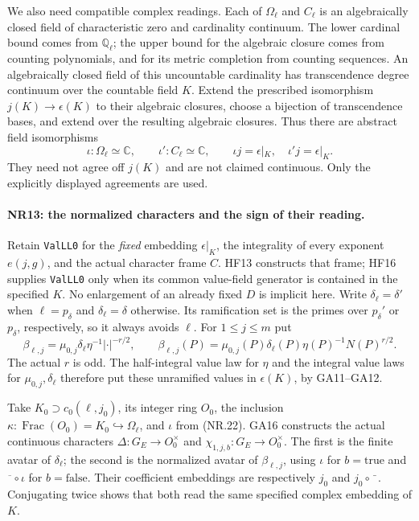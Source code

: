 We also need compatible complex readings. Each of $\Omega_\ell$
and $C_\ell$ is an algebraically closed field of characteristic
zero and cardinality continuum. The lower cardinal bound comes
from $\mathbb Q_\ell$; the upper bound for the algebraic closure
comes from counting polynomials, and for its metric completion
from counting sequences. An algebraically closed field of this
uncountable cardinality has transcendence degree continuum over
the countable field $K$. Extend the prescribed isomorphism
$j(K)\to\epsilon(K)$ to their algebraic closures, choose a
bijection of transcendence bases, and extend over the resulting
algebraic closures. Thus there are abstract field isomorphisms
\[
 \iota:\Omega_\ell\simeq\mathbb C,\qquad
 \iota':C_\ell\simeq\mathbb C,\qquad
           \iota j=\epsilon|_K,\quad\iota'j=\epsilon|_K.
                                                               \tag{NR.22}
\]
They need not agree off $j(K)$ and are not claimed continuous.
Only the explicitly displayed agreements are used.

\paragraph{NR13: the normalized characters and the sign of their reading.}
Retain \texttt{ValLL0} for the \emph{fixed} embedding
$\epsilon|_K$, the integrality of every exponent $e(j,g)$, and
the actual character frame $C$. HF13 constructs that frame;
HF16 supplies \texttt{ValLL0} only when its common value-field
generator is contained in the specified $K$. No enlargement of
an already fixed $D$ is implicit here.
Write $\delta_\ell=\delta'$ when $\ell=p_\delta$ and
$\delta_\ell=\delta$ otherwise. Its ramification set is the
primes over $p_\delta'$ or $p_\delta$, respectively, so it always
avoids $\ell$. For $1\le j\le m$ put
\[
 \beta_{\ell,j}
     =\mu_{0,j}\delta_\ell\eta^{-1}|\cdot|^{-r/2},
 \qquad
 \beta_{\ell,j}(P)
     =\mu_{0,j}(P)\delta_\ell(P)\eta(P)^{-1}N(P)^{r/2}.
                                                               \tag{NR.23}
\]
The actual $r$ is odd. The half-integral value law for $\eta$
and the integral value laws for $\mu_{0,j},\delta_\ell$ therefore
put these unramified values in $\epsilon(K)$, by GA11--GA12.

Take $K_0\supset c_0(\ell,j_0)$, its integer ring $O_0$, the
inclusion $\kappa:\operatorname{Frac}(O_0)=K_0\hookrightarrow
\Omega_\ell$, and $\iota$ from (NR.22). GA16 constructs the
actual continuous characters $\Delta:G_E\to O_0^\times$ and
$\chi_{1,j,b}:G_E\to O_0^\times$. The first is the finite
avatar of $\delta_\ell$; the second is the normalized avatar of
$\beta_{\ell,j}$, using $\iota$ for $b=\mathrm{true}$ and
$\overline{\phantom z}\circ\iota$ for $b=\mathrm{false}$.
Their coefficient embeddings are respectively $j_0$ and
$j_0\circ\bar{\phantom x}$. Conjugating twice shows that both
read the same specified complex embedding of $K$.

